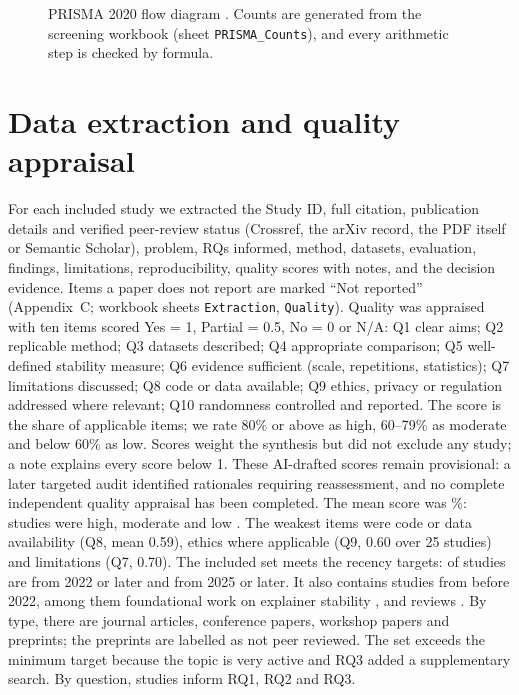\begin{figure}[H]
{}
\caption{PRISMA 2020 flow diagram \cite{page2021}. Counts are generated from the screening workbook (sheet \texttt{PRISMA\_Counts}), and every arithmetic step is checked by formula.}\label{fig:prisma}
\end{figure}

\section{Data extraction and quality appraisal}
For each included study we extracted the Study ID, full citation, publication details and verified peer-review status (Crossref, the arXiv record, the PDF itself or Semantic Scholar), problem, RQs informed, method, datasets, evaluation, findings, limitations, reproducibility, quality scores with notes, and the decision evidence. Items a paper does not report are marked ``Not reported'' (Appendix~C; workbook sheets \texttt{Extraction}, \texttt{Quality}). Quality was appraised with ten items scored Yes = 1, Partial = 0.5, No = 0 or N/A: Q1 clear aims; Q2 replicable method; Q3 datasets described; Q4 appropriate comparison; Q5 well-defined stability measure; Q6 evidence sufficient (scale, repetitions, statistics); Q7 limitations discussed; Q8 code or data available; Q9 ethics, privacy or regulation addressed where relevant; Q10 randomness controlled and reported. The score is the share of applicable items; we rate 80\% or above as high, 60--79\% as moderate and below 60\% as low. Scores weight the synthesis but did not exclude any study; a note explains every score below 1. These AI-drafted scores remain provisional: a later targeted audit identified rationales requiring reassessment, and no complete independent quality appraisal has been completed. The mean score was \qaMean\%: \qaHigh{} studies were high, \qaMod{} moderate and \qaLow{} low \cite{S15,S55}. The weakest items were code or data availability (Q8, mean 0.59), ethics where applicable (Q9, 0.60 over 25 studies) and limitations (Q7, 0.70). The included set meets the recency targets: \incSinceTwentyTwo{} of \totalIncluded{} studies are from 2022 or later and \incSinceTwentyFive{} from 2025 or later. It also contains \incBeforeTwentyTwo{} studies from before 2022, among them foundational work on explainer stability \cite{S01,S04,S08}, and \mapreview{} reviews \evreview. By type, there are \incJournal{} journal articles, \incConference{} conference papers, \incWorkshop{} workshop papers and \incPreprint{} preprints; the preprints are labelled as not peer reviewed. The set exceeds the minimum target because the topic is very active and RQ3 added a supplementary search. By question, \rqOne{} studies inform RQ1, \rqTwo{} RQ2 and \rqThree{} RQ3.

